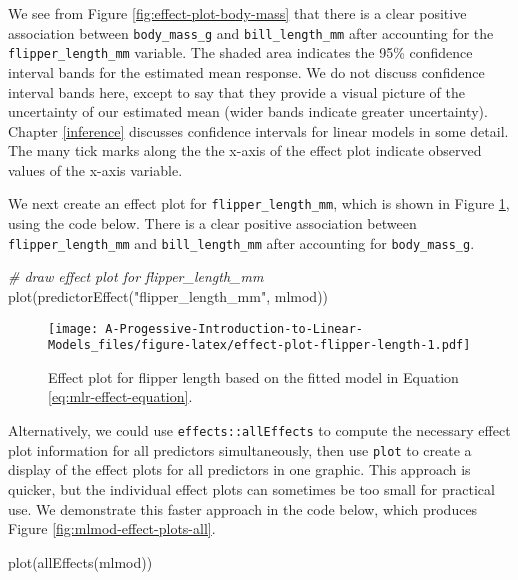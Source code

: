 \documentclass[
]{book}
\newenvironment{Shaded}{\begin{snugshade}}{\end{snugshade}}
\newcommand{\CommentTok}[1]{\textcolor[rgb]{0.56,0.35,0.01}{\textit{#1}}}
\newcommand{\FunctionTok}[1]{\textcolor[rgb]{0.00,0.00,0.00}{#1}}
\newcommand{\NormalTok}[1]{#1}
\newcommand{\StringTok}[1]{\textcolor[rgb]{0.31,0.60,0.02}{#1}}
\theoremstyle{definition}
\theoremstyle{definition}
\theoremstyle{definition}
\theoremstyle{definition}
\theoremstyle{remark}
\begin{document}
We see from Figure \ref{fig:effect-plot-body-mass} that there is a
clear positive association between \texttt{body\_mass\_g} and \texttt{bill\_length\_mm}
after accounting for the \texttt{flipper\_length\_mm} variable. The shaded area
indicates the 95\% confidence interval bands for the estimated mean
response. We do not discuss confidence interval bands here, except to
say that they provide a visual picture of the uncertainty of our
estimated mean (wider bands indicate greater uncertainty). Chapter
\ref{inference} discusses confidence intervals for linear models in
some detail. The many tick marks along the the x-axis of the effect plot
indicate observed values of the x-axis variable.

We next create an effect plot for \texttt{flipper\_length\_mm}, which is shown in
Figure \ref{fig:effect-plot-flipper-length}, using the code below.
There is a clear positive association between \texttt{flipper\_length\_mm} and
\texttt{bill\_length\_mm} after accounting for \texttt{body\_mass\_g}.

\begin{Shaded}
\begin{Highlighting}[]
\CommentTok{\# draw effect plot for flipper\_length\_mm}
\FunctionTok{plot}\NormalTok{(}\FunctionTok{predictorEffect}\NormalTok{(}\StringTok{"flipper\_length\_mm"}\NormalTok{, mlmod))}
\end{Highlighting}
\end{Shaded}

\begin{figure}
\centering
\texttt{[image: A-Progessive-Introduction-to-Linear-Models\_files/figure-latex/effect-plot-flipper-length-1.pdf]}
\caption{\label{fig:effect-plot-flipper-length}Effect plot for flipper length based on the fitted model in Equation \eqref{eq:mlr-effect-equation}.}
\end{figure}

Alternatively, we could use \texttt{effects::allEffects} to compute the
necessary effect plot information for all predictors simultaneously,
then use \texttt{plot} to create a display of the effect plots for all
predictors in one graphic. This approach is quicker, but the individual
effect plots can sometimes be too small for practical use. We
demonstrate this faster approach in the code below, which produces
Figure \ref{fig:mlmod-effect-plots-all}.

\begin{Shaded}
\begin{Highlighting}[]
\FunctionTok{plot}\NormalTok{(}\FunctionTok{allEffects}\NormalTok{(mlmod))}
\end{Highlighting}
\end{Shaded}
\end{document}
